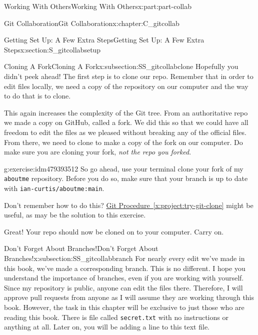 \documentclass[oneside,10pt,]{book}
\newcommand{\xreffont}{\relax}
\newcommand{\mono}[1]{\texttt{#1}}
\begin{document}
\begin{partptx}{Working With Others}{}{Working With Others}{}{}{x:part:part-collab}
\begin{chapterptx}{Git Collaboration}{}{Git Collaboration}{}{}{x:chapter:C_gitcollab}
\begin{sectionptx}{Getting Set Up: A Few Extra Steps}{}{Getting Set Up: A Few Extra Steps}{}{}{x:section:S_gitcollabsetup}
\begin{introduction}{}
\end{introduction}%
%
%
\typeout{************************************************}
\typeout{************************************************}
%
\begin{subsectionptx}{Cloning A Fork}{}{Cloning A Fork}{}{}{x:subsection:SS_gitcollabclone}
%
%
Hopefully you didn't peek ahead! The first step is to clone our repo. Remember that in order to edit files locally, we need a copy of the repository on our computer and the way to do that is to clone.%
\par
This again increases the complexity of the Git tree. From an authoritative repo we made a copy on GitHub, called a fork. We did this so that we could have all freedom to edit the files as we pleased without breaking any of the official files. From there, we need to clone to make a copy of the fork on our computer. Do make sure you are cloning your fork, \emph{not the repo you forked}.%
\begin{inlineexercise}{}{g:exercise:idm479393512}%
So go ahead, use your terminal clone your fork of my \mono{aboutme} repository. Before you do so, make sure that your branch is up to date with \mono{ian-curtis/aboutme:main}.%
\par
Don't remember how to do this? \hyperref[x:project:try-git-clone]{Git Procedure~{\xreffont\ref{x:project:try-git-clone}}} might be useful, as may be the solution to this exercise.%
\end{inlineexercise}%
Great! Your repo should now be cloned on to your computer. Carry on.%
\end{subsectionptx}
%
%
\typeout{************************************************}
\typeout{************************************************}
%
\begin{subsectionptx}{Don't Forget About Branches!}{}{Don't Forget About Branches!}{}{}{x:subsection:SS_gitcollabbranch}
%
%
For nearly every edit we've made in this book, we've made a corresponding branch. This is no different. I hope you understand the importance of branches, even if you are working with yourself. Since my repository is public, anyone can edit the files there. Therefore, I will approve pull requests from anyone as I will assume they are working through this book. However, the task in this chapter will be exclusive to just those who are reading this book. There is file called \mono{secret.txt} with no instructions or anything at all. Later on, you will be adding a line to this text file.%

\end{subsectionptx}
\end{sectionptx}
\end{chapterptx}
\end{partptx}
\end{document}
